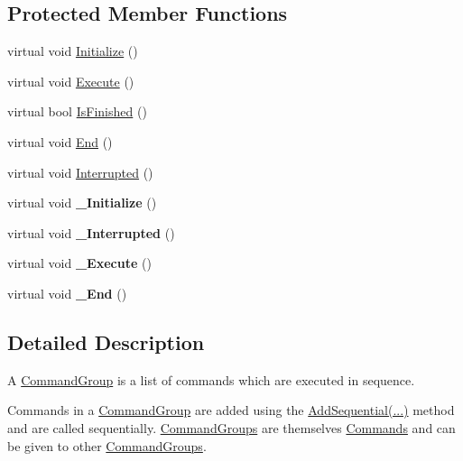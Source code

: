 \subsection*{Protected Member Functions}
\begin{DoxyCompactItemize}
\item 
virtual void \hyperlink{classCommandGroup_a931fcdff139e228e5aa977eba9c42c6b}{Initialize} ()
\item 
virtual void \hyperlink{classCommandGroup_ab59b32de7a4daeb4d27e5ce1f8dd6895}{Execute} ()
\item 
virtual bool \hyperlink{classCommandGroup_a708bf0bb9ca1285bdfb9a548f3437811}{IsFinished} ()
\item 
virtual void \hyperlink{classCommandGroup_a340f5e4fc0ca9ee2d4eaf1c09e5dfe7b}{End} ()
\item 
virtual void \hyperlink{classCommandGroup_a56d224d9b9e4f7790f7ca42a2b277e0d}{Interrupted} ()
\item 
\hypertarget{classCommandGroup_a28b8b3ff819a64555fd6341589cfc455}{
virtual void {\bfseries \_\-Initialize} ()}
\label{classCommandGroup_a28b8b3ff819a64555fd6341589cfc455}

\item 
\hypertarget{classCommandGroup_ad3ff13abeb2f4b051e88cb5d3c874347}{
virtual void {\bfseries \_\-Interrupted} ()}
\label{classCommandGroup_ad3ff13abeb2f4b051e88cb5d3c874347}

\item 
\hypertarget{classCommandGroup_ad9b5deb4bcefe5e00a63e0eec9300523}{
virtual void {\bfseries \_\-Execute} ()}
\label{classCommandGroup_ad9b5deb4bcefe5e00a63e0eec9300523}

\item 
\hypertarget{classCommandGroup_a7c85be5c78703c542bbda74fc4173202}{
virtual void {\bfseries \_\-End} ()}
\label{classCommandGroup_a7c85be5c78703c542bbda74fc4173202}

\end{DoxyCompactItemize}


\subsection{Detailed Description}
A \hyperlink{classCommandGroup}{CommandGroup} is a list of commands which are executed in sequence.

Commands in a \hyperlink{classCommandGroup}{CommandGroup} are added using the \hyperlink{}{AddSequential(...)} method and are called sequentially. \hyperlink{classCommandGroup}{CommandGroups} are themselves \hyperlink{classCommand}{Commands} and can be given to other \hyperlink{classCommandGroup}{CommandGroups}.

